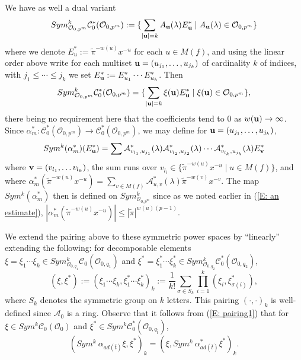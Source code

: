 \documentclass{article}
\theoremstyle{remark}
\def\c #1{ {\mathcal #1} }
\def\b #1{ {\bf #1} }
\begin{document}
We have as well a dual variant 
\[
Sym^k_{\c O_{0, p^m}} \c C_0^*(\c O_{0, p^m}) := \{ \sum_{ |\b u| = k} A_{\b u}(\lambda) E_{\b u}^*\mid A_{\b u}(\lambda) \in \c O_{0, p^m} \}
\]
where we denote $E_u^* := \tilde \pi^{-w(u)} x^{-u}$ for each $u \in M(f)$, and using the linear order above write for each multiset $\b u = (u_{j_1}, \ldots, u_{j_k})$ of cardinality $k$ of indices, with $j_1 \leq \cdots \leq j_k$ we set $E_{\b u}^* := E_{u_1}^* \cdots E_{u_k}^*$. Then
\[
Sym^k_{\c O_{0, p^m}} \c C_0^*(\c O_{0, p^m}) = \{ \sum_{ |\b u| = k} \xi(\b u) E_{\b u}^* \mid \xi(\b u) \in \c O_{0, p^m} \},
\]
there being no requirement here that the coefficients tend to 0 as $w(\b u) \rightarrow \infty$. Since $\alpha_m^*: \c C_{0}^*(\c O_{0, p^m}) \rightarrow \c C_{0}^*(\c O_{0, p^m})$, we may define for $\b u = (u_{j_1}, \ldots, u_{j_k})$,
\[
Sym^k(\alpha_m^*)(E_{\b u}^*) = \sum \mathcal{A}^*_{v_{l_1}, u_{j_1}}(\lambda) \mathcal{A}^*_{v_{l_2}, u_{j_2}}(\lambda) \cdots \mathcal{A}^*_{v_{l_k}, u_{j_k}}(\lambda) E_{\b v}^*
\]
where $\b v = (v_{l_1}, \ldots v_{l_k})$, the sum runs over $v_{l_i} \in \{ \tilde \pi^{- w(u)} x^{-u} \mid u \in M(f) \}$, and where $\alpha_m^*(\tilde \pi^{-w(u)} x^{-u}) = \sum_{v \in M(f)} \mathcal{A}^*_{u, v}(\lambda) \tilde \pi^{-w(v)} x^{-v}$. The map $Sym^k(\alpha_m^*)$ then is defined on $Sym^k_{\c O_{0, p^m}}$ since as we noted earlier in (\ref{E: an estimate}), $|\alpha_m^*(\tilde \pi^{-w(u)} x^{-u}) | \leq |\tilde \pi|^{w(u)(p-1)}$.

We extend the pairing above to these symmetric power spaces by ``linearly'' extending the following: for decomposable elements $\xi = \xi_1 \cdots \xi_k \in Sym^k_{\c O_{0, q_1}} \c C_0(\c O_{0, q_1})$ and $\xi^* = \xi_1^* \cdots \xi_k^* \in Sym^k_{\c O_{0, q_2}} \c C_0^*(\c O_{0, q_2})$,
\begin{equation}\label{E: sym pairing def}
(\xi, \xi^*) := (\xi_1 \cdots \xi_k, \xi_1^* \cdots \xi_k^*)_k := \frac{1}{k!} \sum_{\sigma \in S_k} \prod_{i=1}^k (\xi_i, \xi_{\sigma(i)}^*),
\end{equation}
where $S_k$ denotes the symmetric group on $k$ letters. This pairing $(\cdot, \cdot)_k$ is well-defined since $\c A_0$ is a ring. Observe that it follows from (\ref{E: pairing1}) that for $\xi \in Sym^k \c C_0(\c O_0)$ and $\xi^* \in Sym^k \c C_0^*(\c O_{0, q_{\bar t}})$, 
\begin{equation}\label{E: dual sym}
(Sym^k \> \alpha_{a d(\bar t)} \xi, \xi^*)_k = (\xi, Sym^k \>\alpha_{a d(\bar t)}^* \xi^*)_k.
\end{equation}
\end{document}
